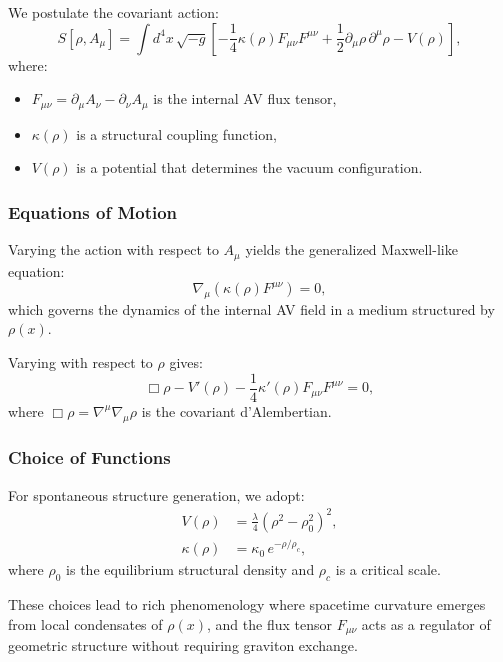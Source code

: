 \documentclass[twoside]{article}
\theoremstyle{definition}
\theoremstyle{remark}
\numberwithin{equation}{section}
\theoremstyle{definition}
\theoremstyle{example}
\theoremstyle{remark}
\numberwithin{equation}{section}%
\begin{document}
We postulate the covariant action:
\begin{equation}
	S[\rho, A_\mu] = \int d^4x\, \sqrt{-g} \left[ -\frac{1}{4} \kappa(\rho) F_{\mu\nu} F^{\mu\nu} + \frac{1}{2} \partial_\mu \rho\, \partial^\mu \rho - V(\rho) \right],
	\label{eq:av-action}
\end{equation}
where:
\begin{itemize}
	\item \( F_{\mu\nu} = \partial_\mu A_\nu - \partial_\nu A_\mu \) is the internal AV flux tensor,
	\item \( \kappa(\rho) \) is a structural coupling function,
	\item \( V(\rho) \) is a potential that determines the vacuum configuration.
\end{itemize}

\subsubsection*{Equations of Motion}

Varying the action with respect to \( A_\mu \) yields the generalized Maxwell-like equation:
\begin{equation}
	\nabla_\mu \left( \kappa(\rho) F^{\mu\nu} \right) = 0,
	\label{eq:eom-A}
\end{equation}
which governs the dynamics of the internal AV field in a medium structured by \( \rho(x) \).

Varying with respect to \( \rho \) gives:
\begin{equation}
	\Box \rho - V'(\rho) - \frac{1}{4} \kappa'(\rho) F_{\mu\nu} F^{\mu\nu} = 0,
	\label{eq:eom-rho}
\end{equation}
where \( \Box \rho = \nabla^\mu \nabla_\mu \rho \) is the covariant d'Alembertian.

\subsubsection*{Choice of Functions}

For spontaneous structure generation, we adopt:
\begin{align}
	V(\rho) &= \frac{\lambda}{4} (\rho^2 - \rho_0^2)^2, \label{eq:potential} \\
	\kappa(\rho) &= \kappa_0\, e^{-\rho / \rho_c}, \label{eq:kappa}
\end{align}
where \( \rho_0 \) is the equilibrium structural density and \( \rho_c \) is a critical scale.

These choices lead to rich phenomenology where spacetime curvature emerges from local condensates of \( \rho(x) \), and the flux tensor \( F_{\mu\nu} \) acts as a regulator of geometric structure without requiring graviton exchange.
\end{document}
